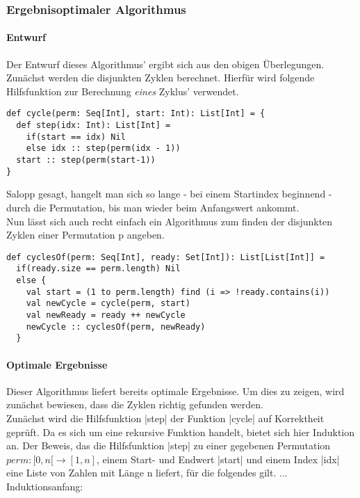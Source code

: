 \subsubsection{Ergebnisoptimaler Algorithmus}
\paragraph{Entwurf}
Der Entwurf dieses Algorithmus' ergibt sich aus den obigen Überlegungen. Zunächst werden die disjunkten Zyklen berechnet.
Hierfür wird folgende Hilfsfunktion zur Berechnung \emph{eines} Zyklus' verwendet.
\lstset{language=Scala}
\lstset{basicstyle=\small}
\begin{lstlisting}
def cycle(perm: Seq[Int], start: Int): List[Int] = {
  def step(idx: Int): List[Int] =
    if(start == idx) Nil
    else idx :: step(perm(idx - 1))
  start :: step(perm(start-1))
}
\end{lstlisting}
Salopp gesagt, hangelt man sich so lange - bei einem Startindex beginnend - durch die Permutation, bis man wieder beim Anfangswert ankommt.\\
Nun lässt sich auch recht einfach ein Algorithmus zum finden der disjunkten Zyklen einer Permutation p angeben.
\lstset{language=Scala}
\lstset{basicstyle=\small}
\begin{lstlisting}
def cyclesOf(perm: Seq[Int], ready: Set[Int]): List[List[Int]] =
  if(ready.size == perm.length) Nil
  else {
    val start = (1 to perm.length) find (i => !ready.contains(i))
    val newCycle = cycle(perm, start)
    val newReady = ready ++ newCycle
    newCycle :: cyclesOf(perm, newReady)
  }
\end{lstlisting}

\paragraph{Optimale Ergebnisse}
Dieser Algorithmus liefert bereits optimale Ergebnisse. Um dies zu zeigen, wird zunächst bewiesen, dass die Zyklen richtig gefunden werden. \\
Zunächst wird die Hilfsfunktion |step| der Funktion |cycle| auf Korrektheit geprüft. Da es sich um eine rekursive Funktion handelt, bietet sich hier Induktion an.
Der Beweis, das die Hilfsfunktion |step| zu einer gegebenen Permutation $perm: [0,n[ \rightarrow [1,n]$, einem Start- und Endwert |start| und einem Index |idx|
eine Liste von Zahlen mit Länge n liefert, für die folgendes gilt. ... \\
Induktionsanfang:

